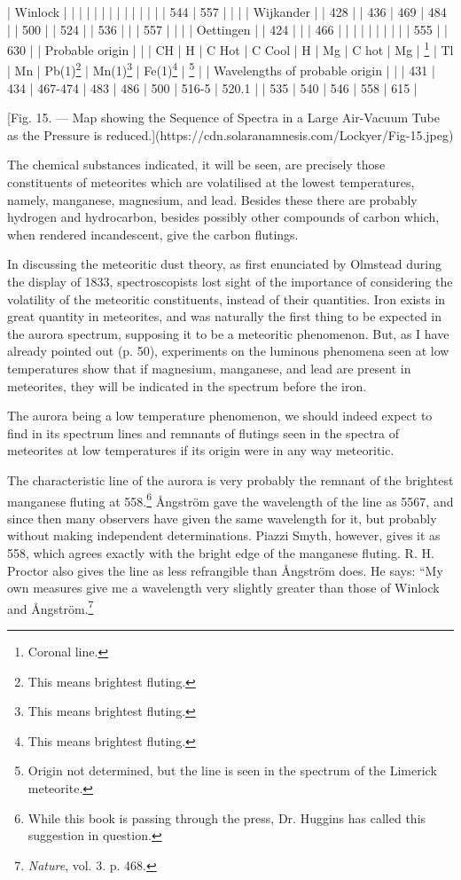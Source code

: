 \documentclass[a4paper, 12pt, oneside, polutonikogreek, english]{article}
\begin{document}
| Winlock                |   |   |   |   |     |         |   |   |    |    |   |   |   | 544  | 557  |    |   |
| Wijkander               |   | 428 |   | 436 | 469   | 484       |   | 500 |    | 524  |   | 536 |   |    | 557  |    |   |
| Oettingen               |   | 424 |   |   | 466   |         |   |   |    |    |   |   |   |    | 555  |    | 630 |
| Probable origin            |   |   | CH | H  | C Hot  | C Cool      | H  | Mg | C hot | Mg  | \footnote{Coronal line.}  | Tl | Mn | Pb(1)\footnote{This means brightest fluting.} | Mn(1)\footnote{This means brightest fluting.} | Fe(1)\footnote{This means brightest fluting.} | \footnote{Origin not determined, but the line is seen in the spectrum of the Limerick meteorite.}  |
| Wavelengths of probable origin    |   |   | 431 | 434 | 467-474 | 483       | 486 | 500 | 516-5 | 520.1 |   | 535 | 540 | 546  | 558  | 615  |

[Fig. 15. --- Map showing the Sequence of Spectra in a Large Air-Vacuum Tube as the Pressure is reduced.](https://cdn.solaranamnesis.com/Lockyer/Fig-15.jpeg)

The chemical substances indicated, it will be seen, are precisely those constituents of meteorites which are volatilised at the lowest temperatures, namely, manganese, magnesium, and lead. Besides these there are probably hydrogen and hydrocarbon, besides possibly other compounds of carbon which, when rendered incandescent, give the carbon flutings.

In discussing the meteoritic dust theory, as first enunciated by Olmstead during the display of 1833, spectroscopists lost sight of the importance of considering the volatility of the meteoritic constituents, instead of their quantities. Iron exists in great quantity in meteorites, and was naturally the first thing to be expected in the aurora spectrum, supposing it to be a meteoritic phenomenon. But, as I have already pointed out (p. 50), experiments on the luminous phenomena seen at low temperatures show that if magnesium, manganese, and lead are present in meteorites, they will be indicated in the spectrum before the iron.

The aurora being a low temperature phenomenon, we should indeed expect to find in its spectrum lines and remnants of flutings seen in the spectra of meteorites at low temperatures if its origin were in any way meteoritic.

The characteristic line of the aurora is very probably the remnant of the brightest manganese fluting at 558.\footnote{While this book is passing through the press, Dr. Huggins has called this suggestion in question.} Ångström gave the wavelength of the line as 5567, and since then many observers have given the same wavelength for it, but probably without making independent determinations. Piazzi Smyth, however, gives it as 558, which agrees exactly with the bright edge of the manganese fluting. R. H. Proctor also gives the line as less refrangible than Ångström does. He says: ``My own measures give me a wavelength very slightly greater than those of Winlock and Ångström.\footnote{\emph{Nature}, vol. 3. p. 468.}
\end{document}
